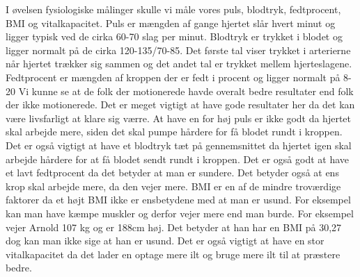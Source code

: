 I øvelsen fysiologiske målinger skulle vi måle vores puls, blodtryk, fedtprocent, BMI og vitalkapacitet. Puls er mængden af gange hjertet slår hvert minut og ligger typisk ved de cirka 60-70 slag per minut. Blodtryk er trykket i blodet og ligger normalt på de cirka 120-135/70-85. Det første tal viser trykket i arterierne når hjertet trækker sig sammen og det andet tal er trykket mellem hjerteslagene. Fedtprocent er mængden af kroppen der er fedt i procent og ligger normalt på 8-20%
Vi kunne se at de folk der motionerede havde overalt bedre resultater end folk der ikke motionerede. Det er meget vigtigt at have gode resultater her da det kan være livsfarligt at klare sig værre. At have en for høj puls er ikke godt da hjertet skal arbejde mere, siden det skal pumpe hårdere for få blodet rundt i kroppen. Det er også vigtigt at have et blodtryk tæt på gennemsnittet da hjertet igen skal arbejde hårdere for at få blodet sendt rundt i kroppen. Det er også godt at have et lavt fedtprocent da det betyder at man er sundere. Det betyder også at ens krop skal arbejde mere, da den vejer mere. BMI er en af de mindre troværdige faktorer da et højt BMI ikke er ensbetydene med at man er usund. For eksempel kan man have kæmpe muskler og derfor vejer mere end man burde. For eksempel vejer Arnold 107 kg og er 188cm høj. Det betyder at han har en BMI på 30,27 dog kan man ikke sige at han er usund. Det er også vigtigt at have en stor vitalkapacitet da det lader en optage mere ilt og bruge mere ilt til at præstere bedre.  
